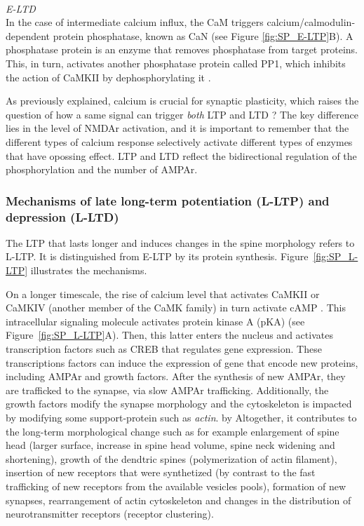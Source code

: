 ~\\
\textit{\acrfull{E-LTD}}\\
In the case of intermediate calcium influx, the \acrfull{CaM} triggers calcium/calmodulin-dependent protein phosphatase, known as \acrfull{CaN} (see Figure \ref{fig:SP_E-LTP}B). A phosphatase protein is an enzyme that removes phosphatase from target proteins. This, in turn, activates another phosphatase protein called \acrfull{PP1}, which inhibits the action of CaMKII by dephosphorylating it \citep{citri_synaptic_2008}. 

As previously explained, calcium is crucial for synaptic plasticity, which raises the question of how a same signal can trigger \textit{both} LTP and LTD ? The key difference lies in the level of NMDAr activation, and it is important to remember that the different types of calcium response selectively activate different types of enzymes that have opossing effect. LTP and LTD reflect the bidirectional regulation of the phosphorylation and the number of AMPAr. \\ 



\subsubsection{Mechanisms of late long-term potentiation (L-LTP) and depression (L-LTD)}
The \acrshort{LTP} that lasts longer and induces changes in the spine morphology refers to \acrfull{L-LTP}. It is distinguished from \acrshort{E-LTP} by its protein synthesis. Figure~\ref{fig:SP_L-LTP} illustrates the mechanisms. 

On a longer timescale, the rise of calcium level that activates \acrshort{CaMKII} or CaMKIV (another member of the CaMK family) in turn activate \acrfull{cAMP} \citep{golbert_sleep_2017}. This  intracellular signaling molecule activates protein kinase A (pKA) (see Figure~\ref{fig:SP_L-LTP}A). Then, this latter enters the nucleus and activates transcription factors such as \acrfull{CREB} that regulates gene expression. These transcriptions factors can induce the expression of gene that encode new proteins, including \acrshort{AMPAr} and growth factors.  After the synthesis of new \acrshort{AMPAr}, they are trafficked to the synapse, via slow AMPAr trafficking. Additionally, the growth factors modify the synapse morphology and the cytoskeleton is impacted by modifying some support-protein such as \textit{actin}.  by Altogether, it contributes to the long-term morphological change such as for example enlargement of spine head (larger surface, increase in spine head volume, spine neck widening and shortening), growth of the dendtric spines (polymerization of actin filament), insertion of new receptors that were synthetized (by contrast to the fast trafficking of new receptors from the available vesicles pools), formation of new synapses, rearrangement of actin cytoskeleton and changes in the distribution of neurotransmitter receptors (receptor clustering).


